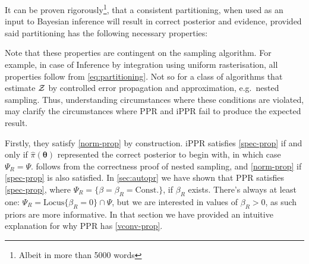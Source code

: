 \documentclass[usenatbib]{mnras}
\begin{document}
It can be proven rigorously\footnote{Albeit in more than 5000 words},
that a consistent partitioning, when used as an input to Bayesian
inference will result in correct posterior and evidence, provided said
partitioning has the following necessary properties:
Note that these properties are contingent on the sampling
algorithm. For example, in case of Inference by integration using
uniform rasterisation, all properties follow from
\cref{eq:partitioning}. Not so for a class of algorithms that estimate
${\cal Z}$ by controlled error propagation and approximation,
e.g.~nested sampling. Thus, understanding circumstances where these
conditions are violated, may clarify the circumstances where PPR and
iPPR fail to produce the expected result.

Firstly, they satisfy \cref{norm-prop} by construction. iPPR satisfies
\cref{spec-prop} if and only if \( \hat{\pi} (\bm{\theta})\)
represented the correct posterior to begin with, in which case
$\Psi_{R} = \Psi$.  follows from the correctness
proof of nested sampling, \citep{Skilling2006} and \cref{norm-prop} if
\cref{spec-prop} is also satisfied. In \cref{sec:autopr} we have shown
that PPR satisfies \cref{spec-prop}, where
$\Psi_{R} = \{ \beta = \beta_{R} = \text{Const.}\}$, if $\beta_{R}$
exists. There's always at least one:
$\Psi_{R} = \text{Locus}\{ \beta_{R}=0 \} \cap \Psi$, but we are
interested in values of $\beta_{R} > 0$, as such priors are more
informative. In that section we have provided an intuitive explanation
for why PPR has \cref{vconv-prop}.
\end{document}
